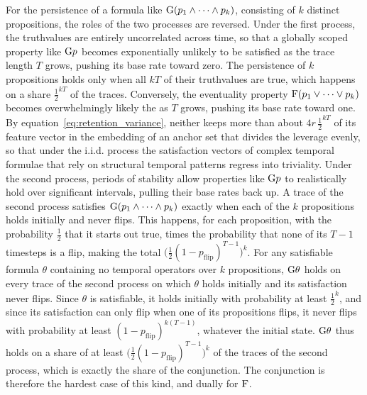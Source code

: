 \documentclass[titlepage,a4paper,11pt]{report}
\begin{document}
    For the persistence of a formula like $\text{G}(p_1\land\dots\land p_k)$, consisting of $k$ distinct propositions, the roles of the two processes are reversed. Under the first process, the truthvalues are entirely uncorrelated across time, so that a globally scoped property like $\text{G} p$ becomes exponentially unlikely to be satisfied as the trace length $T$ grows, pushing its base rate toward zero. The persistence of $k$ propositions holds only when all $kT$ of their truthvalues are true, which happens on a share $\frac12^{kT}$ of the traces. Conversely, the eventuality property $\text{F}(p_1\lor\dots\lor p_k)$ becomes overwhelmingly likely the as $T$ grows, pushing its base rate toward one. By equation~\eqref{eq:retention_variance}, neither keeps more than about $4r\,\frac12^{kT}$ of its feature vector in the embedding of an anchor set that divides the leverage evenly, so that under the i.i.d. process the satisfaction vectors of complex temporal formulae that rely on structural temporal patterns regress into triviality. Under the second process, periods of stability allow properties like $\text{G} p$ to realistically hold over significant intervals, pulling their base rates back up. A trace of the second process satisfies $\text{G}(p_1\land\dots\land p_k)$ exactly when each of the $k$ propositions holds initially and never flips. This happens, for each proposition, with the probability $\frac12$ that it starts out true, times the probability that none of its $T-1$ timesteps is a flip, making the total $\bigl(\frac12(1-p_{\text{flip}})^{T-1}\bigr)^k$. For any satisfiable formula $\theta$ containing no temporal operators over $k$ propositions, $\text{G}\theta$ holds on every trace of the second process on which $\theta$ holds initially and its satisfaction never flips. Since $\theta$ is satisfiable, it holds initially with probability at least $\frac12^{k}$, and since its satisfaction can only flip when one of its propositions flips, it never flips with probability at least $(1-p_{\text{flip}})^{k(T-1)}$, whatever the initial state. $\text{G}\theta$ thus holds on a share of at least $\bigl(\frac12(1-p_{\text{flip}})^{T-1}\bigr)^k$ of the traces of the second process, which is exactly the share of the conjunction. The conjunction is therefore the hardest case of this kind, and dually for $\text{F}$.
\end{document}
